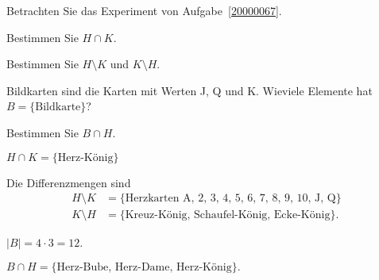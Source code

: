 Betrachten Sie das Experiment von Aufgabe~\ref{20000067}.
\begin{teilaufgaben}
\item
Bestimmen Sie $H\cap K$.
\item
Bestimmen Sie $H\setminus K$ und $K\setminus H$.
\item
Bildkarten sind die Karten mit Werten J, Q und K. 
Wieviele Elemente hat $B=\{\text{Bildkarte}\}$?
\item
Bestimmen Sie $B\cap H$.
\end{teilaufgaben}

\begin{loesung}
\begin{teilaufgaben}
\item
$H\cap K=\{\text{Herz-König}\}$
\item Die Differenzmengen sind
\begin{align*}
H\setminus K
&=
\{\text{Herzkarten A, 2, 3, 4, 5, 6, 7, 8, 9, 10, J, Q}\}
\\
K\setminus H
&=
\{\text{Kreuz-König, Schaufel-König, Ecke-König}\}.
\end{align*}
\item
$|B|=4\cdot 3=12$.
\item
$B\cap H = \{\text{Herz-Bube, Herz-Dame, Herz-König}\}.$
\qedhere
\end{teilaufgaben}
\end{loesung}

